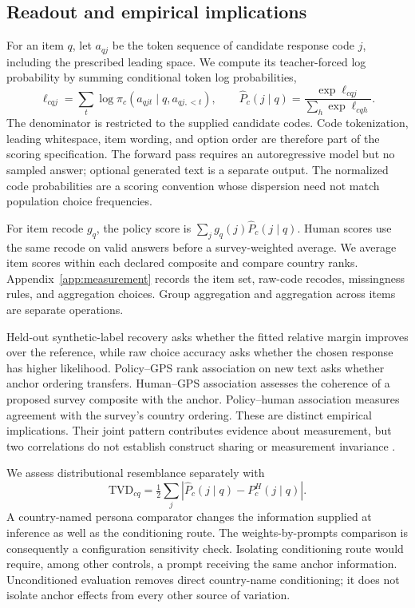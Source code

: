 \subsection{Readout and empirical implications}
For an item $q$, let $a_{qj}$ be the token sequence of candidate response code $j$, including the prescribed leading space. We compute its teacher-forced log probability by summing conditional token log probabilities,
\begin{equation}
\ell_{cqj}=\sum_t\log\widehat\pi_c(a_{qjt}\mid q,a_{qj,<t}),\qquad
\widehat P_c(j\mid q)=\frac{\exp\ell_{cqj}}{\sum_h\exp\ell_{cqh}}.
\label{eq:readout}
\end{equation}
The denominator is restricted to the supplied candidate codes. Code tokenization, leading whitespace, item wording, and option order are therefore part of the scoring specification. The forward pass requires an autoregressive model but no sampled answer; optional generated text is a separate output. The normalized code probabilities are a scoring convention whose dispersion need not match population choice frequencies.

For item recode $g_q$, the policy score is $\sum_jg_q(j)\widehat P_c(j\mid q)$. Human scores use the same recode on valid answers before a survey-weighted average. We average item scores within each declared composite and compare country ranks. Appendix~\ref{app:measurement} records the item set, raw-code recodes, missingness rules, and aggregation choices. Group aggregation and aggregation across items are separate operations.

Held-out synthetic-label recovery asks whether the fitted relative margin improves over the reference, while raw choice accuracy asks whether the chosen response has higher likelihood. Policy--GPS rank association on new text asks whether anchor ordering transfers. Human--GPS association assesses the coherence of a proposed survey composite with the anchor. Policy--human association measures agreement with the survey's country ordering. These are distinct empirical implications. Their joint pattern contributes evidence about measurement, but two correlations do not establish construct sharing or measurement invariance \cite{campbellfiske1959,davidov2014,steenkamp1998}.

We assess distributional resemblance separately with
\begin{equation}
\mathrm{TVD}_{cq}=\tfrac12\sum_j|\widehat P_c(j\mid q)-P_c^{H}(j\mid q)|.
\end{equation}
A country-named persona comparator changes the information supplied at inference as well as the conditioning route. The weights-by-prompts comparison is consequently a configuration sensitivity check. Isolating conditioning route would require, among other controls, a prompt receiving the same anchor information. Unconditioned evaluation removes direct country-name conditioning; it does not isolate anchor effects from every other source of variation.
